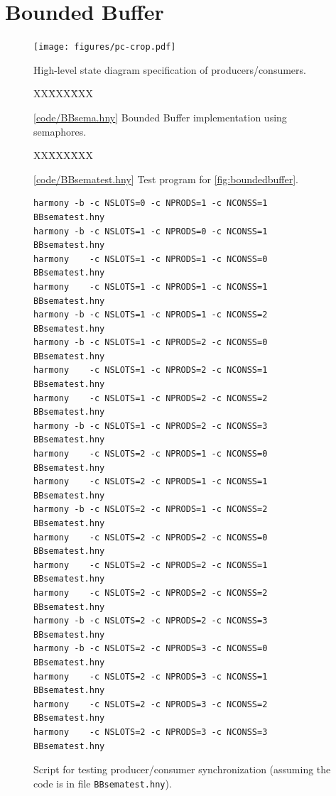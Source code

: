 \documentclass{report}
\newcommand{\harmonysource}[1]{
\begin{tabbing}
XX\=XXX\=XXX\kill
    
\end{tabbing}
}
\newcommand{\harmonylink}[1]{%
[\href{https://www.cs.cornell.edu/home/rvr/harmony/#1}{\underline{#1}}]%
}
\newenvironment{code}{
\tcolorbox
}{
\endtcolorbox
}
\begin{document}
\chapter{Bounded Buffer}
\label{ch:bb}
%
%

%

\begin{figure}
\begin{center}
\texttt{[image: figures/pc-crop.pdf]}
\end{center}
\caption{High-level state diagram specification of producers/consumers.}
\label{fig:pc}
\end{figure}

\begin{figure}
\begin{code}
\harmonysource{BBsema}
\end{code}
\caption{\harmonylink{code/BBsema.hny} Bounded Buffer implementation using semaphores.}
\label{fig:boundedbuffer}
\end{figure}

\begin{figure}
\begin{code}
\harmonysource{BBsematest}
\end{code}
\caption{\harmonylink{code/BBsematest.hny} Test program for \autoref{fig:boundedbuffer}.}
\label{fig:bbtest}
\end{figure}

\begin{figure}
\begin{code}
\begin{verbatim}
harmony -b -c NSLOTS=0 -c NPRODS=1 -c NCONSS=1 BBsematest.hny
harmony -b -c NSLOTS=1 -c NPRODS=0 -c NCONSS=1 BBsematest.hny
harmony    -c NSLOTS=1 -c NPRODS=1 -c NCONSS=0 BBsematest.hny
harmony    -c NSLOTS=1 -c NPRODS=1 -c NCONSS=1 BBsematest.hny
harmony -b -c NSLOTS=1 -c NPRODS=1 -c NCONSS=2 BBsematest.hny
harmony -b -c NSLOTS=1 -c NPRODS=2 -c NCONSS=0 BBsematest.hny
harmony    -c NSLOTS=1 -c NPRODS=2 -c NCONSS=1 BBsematest.hny
harmony    -c NSLOTS=1 -c NPRODS=2 -c NCONSS=2 BBsematest.hny
harmony -b -c NSLOTS=1 -c NPRODS=2 -c NCONSS=3 BBsematest.hny
harmony    -c NSLOTS=2 -c NPRODS=1 -c NCONSS=0 BBsematest.hny
harmony    -c NSLOTS=2 -c NPRODS=1 -c NCONSS=1 BBsematest.hny
harmony -b -c NSLOTS=2 -c NPRODS=1 -c NCONSS=2 BBsematest.hny
harmony    -c NSLOTS=2 -c NPRODS=2 -c NCONSS=0 BBsematest.hny
harmony    -c NSLOTS=2 -c NPRODS=2 -c NCONSS=1 BBsematest.hny
harmony    -c NSLOTS=2 -c NPRODS=2 -c NCONSS=2 BBsematest.hny
harmony -b -c NSLOTS=2 -c NPRODS=2 -c NCONSS=3 BBsematest.hny
harmony -b -c NSLOTS=2 -c NPRODS=3 -c NCONSS=0 BBsematest.hny
harmony    -c NSLOTS=2 -c NPRODS=3 -c NCONSS=1 BBsematest.hny
harmony    -c NSLOTS=2 -c NPRODS=3 -c NCONSS=2 BBsematest.hny
harmony    -c NSLOTS=2 -c NPRODS=3 -c NCONSS=3 BBsematest.hny
\end{verbatim}
\end{code}
\caption{Script for testing producer/consumer synchronization
(assuming the code is in file \texttt{BBsematest.hny}).}
\label{fig:pcscript}
\end{figure}
\end{document}
